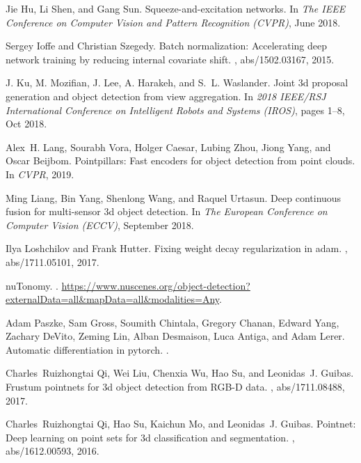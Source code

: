 \documentclass[10pt,twocolumn,letterpaper]{article}
\begin{document}
{\begin{thebibliography}{10}
Jie Hu, Li Shen, and Gang Sun.
\newblock Squeeze-and-excitation networks.
\newblock In {\em The IEEE Conference on Computer Vision and Pattern
  Recognition (CVPR)}, June 2018.

Sergey Ioffe and Christian Szegedy.
\newblock Batch normalization: Accelerating deep network training by reducing
  internal covariate shift.
, abs/1502.03167, 2015.

J. {Ku}, M. {Mozifian}, J. {Lee}, A. {Harakeh}, and S.~L. {Waslander}.
\newblock Joint 3d proposal generation and object detection from view
  aggregation.
\newblock In {\em 2018 IEEE/RSJ International Conference on Intelligent Robots
  and Systems (IROS)}, pages 1--8, Oct 2018.

Alex~H. Lang, Sourabh Vora, Holger Caesar, Lubing Zhou, Jiong Yang, and Oscar
  Beijbom.
\newblock Pointpillars: Fast encoders for object detection from point clouds.
\newblock In {\em CVPR}, 2019.

Ming Liang, Bin Yang, Shenlong Wang, and Raquel Urtasun.
\newblock Deep continuous fusion for multi-sensor 3d object detection.
\newblock In {\em The European Conference on Computer Vision (ECCV)}, September
  2018.

Ilya Loshchilov and Frank Hutter.
\newblock Fixing weight decay regularization in adam.
, abs/1711.05101, 2017.

nuTonomy.
.
\newblock
  \url{https://www.nuscenes.org/object-detection?externalData=all&mapData=all&modalities=Any}.

Adam Paszke, Sam Gross, Soumith Chintala, Gregory Chanan, Edward Yang, Zachary
  DeVito, Zeming Lin, Alban Desmaison, Luca Antiga, and Adam Lerer.
\newblock Automatic differentiation in pytorch.
.

Charles~Ruizhongtai Qi, Wei Liu, Chenxia Wu, Hao Su, and Leonidas~J. Guibas.
\newblock Frustum pointnets for 3d object detection from {RGB-D} data.
, abs/1711.08488, 2017.

Charles~Ruizhongtai Qi, Hao Su, Kaichun Mo, and Leonidas~J. Guibas.
\newblock Pointnet: Deep learning on point sets for 3d classification and
  segmentation.
, abs/1612.00593, 2016.


\end{thebibliography}}
\end{document}

